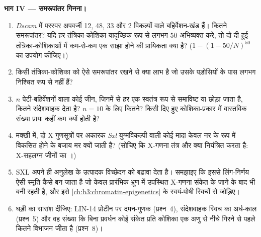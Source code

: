 \begin{problem}
\medskip
\noindent\textbf{भाग IV --- समरूपांतर गिनना।}
\begin{enumerate}[resume]
  \item \emph{Dscam} में परस्पर अपवर्जी 12, 48, 33 और 2 विकल्पों वाले
        बहिर्वेशन-खंड हैं। कितने समरूपांतर? यदि हर तंत्रिका-कोशिका
        यादृच्छिक रूप से लगभग $50$ अभिव्यक्त करे, तो दो दी हुई
        तंत्रिका-कोशिकाओं में कम-से-कम एक साझा होने की प्रायिकता क्या
        है? ($1 - (1 -
        50/N)^{50}$ का उपयोग कीजिए।)
  \item किसी तंत्रिका-कोशिका को ऐसे समरूपांतर रखने से क्या लाभ है जो
        उसके पड़ोसियों के पास लगभग निश्चित रूप से नहीं हैं?
  \item $n$ पेटी-बहिर्वेशनों वाला कोई जीन, जिनमें से हर एक स्वतंत्र
        रूप से समाविष्ट या छोड़ा जाता है, कितने संदेशवाहक देता है?
        $n = 10$ के लिए कितने? किसी दिए हुए कोशिका-प्रकार में
        वास्तविक संख्या प्रायः कहीं कम क्यों होती है?
  \item मक्खी में, दो X गुणसूत्रों पर अकारक \emph{Sxl} युग्मविकल्पी
        वाली कोई मादा केवल नर के रूप में विकसित होने के बजाय मर क्यों
        जाती है? (सोचिए कि X-गणना तंत्र और क्या नियंत्रित करता है:
        X-सहलग्न जीनों का ।)
  \item SXL अपने ही अनुलेख के उत्पादक विच्छेदन को बढ़ावा देता है।
        समझाइए कि इससे लिंग-निर्णय ऐसी स्मृति कैसे बन जाता है जो
        केवल प्रारंभिक भ्रूण में उपस्थित X-गणना संकेत के जाने के बाद
        भी बनी रहती है, और इसे \cref{ch:b3:chromatin-epigenetics} के
        स्वयं-पोषी स्विचों से जोड़िए।
  \item घड़ी का सारांश दीजिए: LIN-14 प्रोटीन पर दमन-गुणक (प्रश्न~4),
        संदेशवाहक स्विच का अर्ध-काल (प्रश्न~5) और वह संख्या कि बिना
        प्रवर्धन कोई संकेत प्रति कोशिका एक अणु से नीचे गिरने से पहले
        कितने विभाजन जीता है (प्रश्न~8)।
\end{enumerate}
\end{problem}
